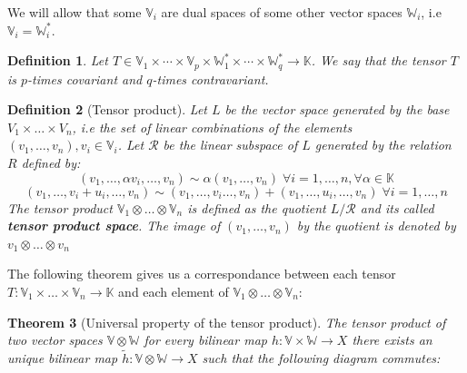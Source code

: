 \documentclass[11pt,a4paper,openright,oneside]{book}
\numberwithin{equation}{section}
\newtheorem{defn0}{Definition}[chapter]
\newtheorem{thm0}[defn0]{Theorem}
\newenvironment{definition}{ \begin{defn0}}{\end{defn0}}
\newenvironment{theorem}{\bigskip \begin{thm0}}{\end{thm0}}
\begin{document}
We will allow that some $\mathbb{V}_i$ are dual spaces of some other vector spaces $\mathbb{W}_i$, i.e $\mathbb{V}_i = \mathbb{W}_i^*$.
\begin{definition}
    Let $T \in \mathbb{V}_1 \times \cdots \times \mathbb{V}_p \times \mathbb{W}_1^* \times \cdots \times \mathbb{W}_q^* \rightarrow \mathbb{K}$.
    We say that the tensor $T$ is $p$-times covariant and $q$-times contravariant.
\end{definition}

\begin{definition}[Tensor product] Let $L$ be the vector space generated by the base ${V_1 \times \dots \times V_n}$, i.e the
    set of linear combinations of the elements $(v_1, \dots, v_n), v_i \in \mathbb{V}_i$. Let $\mathcal{R}$ be the linear subspace of
    $L$ generated by the relation $R$ defined by:
    $$(v_1, \dots, \alpha v_i, \dots, v_n) \sim \alpha(v_1, \dots, v_n) \; \forall i = 1, \dots, n, \forall \alpha \in \mathbb{K}$$
    $$(v_1, \dots, v_i + u_i, \dots, v_n) \sim (v_1, \dots, v_i \dots, v_n) + (v_1, \dots, u_i, \dots, v_n) \; \forall i = 1, \dots, n$$
    The tensor product $\mathbb{V}_1 \otimes \dots \otimes \mathbb{V}_n$ is defined as the quotient $L / \mathcal{R}$ and its called 
    \textbf{tensor product space}. The image of
    $(v_1, \dots, v_n)$ by the quotient is denoted by $v_1 \otimes \dots \otimes v_n$
\end{definition}

The following theorem gives us a correspondance between each tensor ${T: \mathbb{V}_1 \times \dots \times \mathbb{V}_n \rightarrow \mathbb{K}}$
and each element of $\mathbb{V}_1 \otimes \dots \otimes \mathbb{V}_n$:

\begin{theorem}[Universal property of the tensor product]
    The tensor product of two vector spaces $\mathbb{V} \otimes \mathbb{W}$
    for every bilinear map $h: \mathbb{V} \times \mathbb{W} \rightarrow X$ there exists an unique bilinear map $\tilde{h}: \mathbb{V} \otimes
    \mathbb{W} \rightarrow X$ such that the following diagram commutes:

    \centering

\end{theorem}
\end{document}
